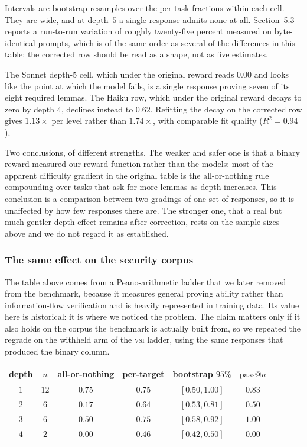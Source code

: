 \documentclass[11pt]{article}
\begin{document}
Intervals are bootstrap resamples over the per-task fractions within each cell.
They are wide, and at depth~$5$ a single response admits none at all. Section~5.3
reports a run-to-run variation of roughly twenty-five percent measured on
byte-identical prompts, which is of the same order as several of the differences
in this table; the corrected row should be read as a shape, not as five
estimates.

The Sonnet depth-$5$ cell, which under the original reward reads $0.00$ and looks
like the point at which the model fails, is a single response proving seven of
its eight required lemmas. The Haiku row, which under the original reward decays
to zero by depth $4$, declines instead to $0.62$. Refitting the decay on the
corrected row gives $1.13\times$ per level rather than $1.74\times$, with
comparable fit quality ($R^2 = 0.94$).

Two conclusions, of different strengths. The weaker and safer one is that a
binary reward measured our reward function rather than the models: most of the
apparent difficulty gradient in the original table is the all-or-nothing rule
compounding over tasks that ask for more lemmas as depth increases. This
conclusion is a comparison between two gradings of one set of responses, so it is
unaffected by how few responses there are. The stronger one, that a real but much
gentler depth effect remains after correction, rests on the sample sizes above
and we do not regard it as established.

\subsubsection*{The same effect on the security corpus}

The table above comes from a Peano-arithmetic ladder that we later removed from
the benchmark, because it measures general proving ability rather than
information-flow verification and is heavily represented in training data. Its
value here is historical: it is where we noticed the problem. The claim matters
only if it also holds on the corpus the benchmark is actually built from, so we
repeated the regrade on the withheld arm of the \textsc{vsi} ladder, using the
same responses that produced the binary column.

\begin{center}
\begin{tabular}{cccccc}
\toprule
depth & $n$ & all-or-nothing & per-target & bootstrap $95\%$ & $\mathrm{pass}@n$ \\
\midrule
$1$ & $12$ & $0.75$ & $0.75$ & $[0.50, 1.00]$ & $0.83$ \\
$2$ & $6$  & $0.17$ & $0.64$ & $[0.53, 0.81]$ & $0.50$ \\
$3$ & $6$  & $0.50$ & $0.75$ & $[0.58, 0.92]$ & $1.00$ \\
$4$ & $2$  & $0.00$ & $0.46$ & $[0.42, 0.50]$ & $0.00$ \\
\bottomrule
\end{tabular}
\end{center}
\end{document}
